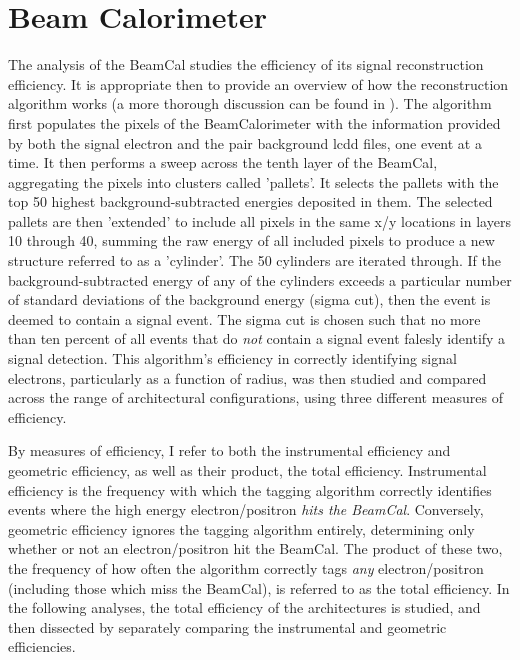 \documentclass{report}
\begin{document}
        \section{Beam Calorimeter}
            The analysis of the BeamCal studies the efficiency of its signal reconstruction efficiency. It is appropriate then to provide an overview of how the reconstruction algorithm works (a more thorough discussion can be found in \cite{bogert_thesis}). The algorithm first populates the pixels of the BeamCalorimeter with the information provided by both the signal electron and the pair background lcdd files, one event at a time. It then performs a sweep across the tenth layer of the BeamCal, aggregating the pixels into clusters called 'pallets'. It selects the pallets with the top 50 highest background-subtracted energies deposited in them. The selected pallets are then 'extended' to include all pixels in the same x/y locations in layers 10 through 40, summing the raw energy of all included pixels to produce a new structure referred to as a 'cylinder'. The 50 cylinders are iterated through. If the background-subtracted energy of any of the cylinders exceeds a particular number of standard deviations of the background energy (sigma cut), then the event is deemed to contain a signal event. The sigma cut is chosen such that no more than ten percent of all events that do \textit{not} contain a signal event falesly identify a signal detection. This algorithm's efficiency in correctly identifying signal electrons, particularly as a function of radius, was then studied and compared across the range of architectural configurations, using three different measures of efficiency.

            By measures of efficiency, I refer to both the instrumental efficiency and geometric efficiency, as well as their product, the total efficiency. Instrumental efficiency is the frequency with which the tagging algorithm correctly identifies events where the high energy electron/positron \textit{hits the BeamCal}. Conversely, geometric efficiency ignores the tagging algorithm entirely, determining only whether or not an electron/positron hit the BeamCal. The product of these two, the frequency of how often the algorithm correctly tags \textit{any} electron/positron (including those which miss the BeamCal), is referred to as the total efficiency. In the following analyses, the total efficiency of the architectures is studied, and then dissected by separately comparing the instrumental and geometric efficiencies.
\end{document}
